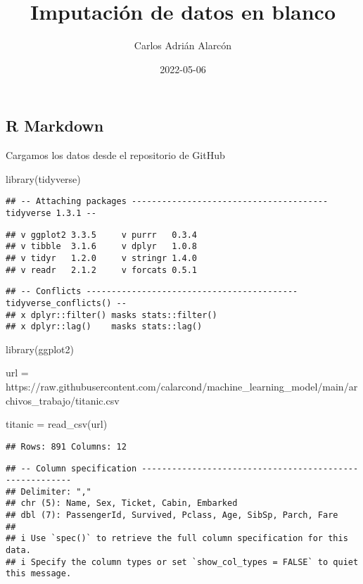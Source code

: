 \documentclass[
]{article}
\title{Imputación de datos en blanco}
\author{Carlos Adrián Alarcón}
\date{2022-05-06}
\newenvironment{Shaded}{\begin{snugshade}}{\end{snugshade}}
\newcommand{\FunctionTok}[1]{\textcolor[rgb]{0.00,0.00,0.00}{#1}}
\newcommand{\NormalTok}[1]{#1}
\newcommand{\OtherTok}[1]{\textcolor[rgb]{0.56,0.35,0.01}{#1}}
\newcommand{\StringTok}[1]{\textcolor[rgb]{0.31,0.60,0.02}{#1}}
\begin{document}
\maketitle

\hypertarget{r-markdown}{%
\subsection{R Markdown}\label{r-markdown}}

Cargamos los datos desde el repositorio de GitHub

\begin{Shaded}
\begin{Highlighting}[]
\FunctionTok{library}\NormalTok{(tidyverse)}
\end{Highlighting}
\end{Shaded}

\begin{verbatim}
## -- Attaching packages --------------------------------------- tidyverse 1.3.1 --
\end{verbatim}

\begin{verbatim}
## v ggplot2 3.3.5     v purrr   0.3.4
## v tibble  3.1.6     v dplyr   1.0.8
## v tidyr   1.2.0     v stringr 1.4.0
## v readr   2.1.2     v forcats 0.5.1
\end{verbatim}

\begin{verbatim}
## -- Conflicts ------------------------------------------ tidyverse_conflicts() --
## x dplyr::filter() masks stats::filter()
## x dplyr::lag()    masks stats::lag()
\end{verbatim}

\begin{Shaded}
\begin{Highlighting}[]
\FunctionTok{library}\NormalTok{(ggplot2)}

\NormalTok{url }\OtherTok{=} \StringTok{\textquotesingle{}https://raw.githubusercontent.com/calarcond/machine\_learning\_model/main/archivos\_trabajo/titanic.csv\textquotesingle{}}

\NormalTok{titanic }\OtherTok{=} \FunctionTok{read\_csv}\NormalTok{(url)}
\end{Highlighting}
\end{Shaded}

\begin{verbatim}
## Rows: 891 Columns: 12
\end{verbatim}

\begin{verbatim}
## -- Column specification --------------------------------------------------------
## Delimiter: ","
## chr (5): Name, Sex, Ticket, Cabin, Embarked
## dbl (7): PassengerId, Survived, Pclass, Age, SibSp, Parch, Fare
## 
## i Use `spec()` to retrieve the full column specification for this data.
## i Specify the column types or set `show_col_types = FALSE` to quiet this message.
\end{verbatim}
\end{document}
